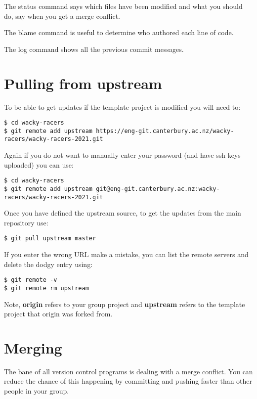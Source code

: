 The status command says which files have been modified and what you
should do, say when you get a merge conflict.

The blame command is useful to determine who authored each line of code.

The log command shows all the previous commit messages.


\section{Pulling from upstream}
\label{git-pulling-from-upstream}

To be able to get updates if the template project is modified you will
need to:

\begin{verbatim}
$ cd wacky-racers 
$ git remote add upstream https://eng-git.canterbury.ac.nz/wacky-racers/wacky-racers-2021.git  
\end{verbatim}

Again if you do not want to manually enter your password (and have
ssh-keys uploaded) you can use:
%
\begin{verbatim}
$ cd wacky-racers 
$ git remote add upstream git@eng-git.canterbury.ac.nz:wacky-racers/wacky-racers-2021.git
\end{verbatim}

Once you have defined the upstream source, to get the updates from the
main repository use:
%
\begin{verbatim}
$ git pull upstream master
\end{verbatim}

If you enter the wrong URL make a mistake, you can list the remote
servers and delete the dodgy entry using:

\begin{verbatim}
$ git remote -v
$ git remote rm upstream
\end{verbatim}

Note, \textbf{origin} refers to your group project and \textbf{upstream}
refers to the template project that origin was forked from.

\section{Merging}
\label{git-merging}

The bane of all version control programs is dealing with a merge
conflict. You can reduce the chance of this happening by committing and
pushing faster than other people in your group.

